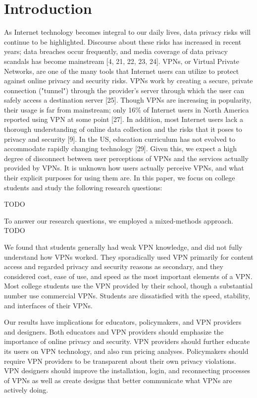 \section{Introduction}

As Internet technology becomes integral to our daily lives, data privacy risks will continue to be highlighted. Discourse about these risks has increased in recent years; data breaches occur frequently, and media coverage of data privacy scandals has become mainstream [4, 21, 22, 23, 24]. VPNs, or Virtual Private Networks, are one of the many tools that Internet users can utilize to protect against online privacy and security risks. VPNs work by creating a secure, private connection ("tunnel") through the provider's server through which the user can safely access a destination server [25]. Though VPNs are increasing in popularity, their usage is far from mainstream; only 16\% of Internet users in North America reported using VPN at some point [27]. In addition, most Internet users lack a thorough understanding of online data collection and the risks that it poses to privacy and security [9]. In the US, education curriculum has not evolved to accommodate rapidly changing technology [29]. Given this, we expect a high degree of disconnect between user perceptions of VPNs and the services actually provided by VPNs. It is unknown how users actually perceive VPNs, and what their explicit purposes for using them are. In this paper, we focus on college students and study the following research questions:

TODO

To answer our research questions, we employed a mixed-methods approach. TODO

We found that students generally had weak VPN knowledge, and did not fully understand how VPNs worked. They sporadically used VPN primarily for content access and regarded privacy and security reasons as secondary, and they considered cost, ease of use, and speed as the most important elements of a VPN. Most college students use the VPN provided by their school, though a substantial number use commercial VPNs. Students are dissatisfied with the speed, stability, and interfaces of their VPNs.

Our results have implications for educators, policymakers, and VPN providers and designers. Both educators and VPN providers should emphasize the importance of online privacy and security. VPN providers should further educate its users on VPN technology, and also run pricing analyses. Policymakers should require VPN providers to be transparent about their own privacy violations. VPN designers should improve the installation, login, and reconnecting processes of VPNs as well as create designs that better communicate what VPNs are actively doing.

